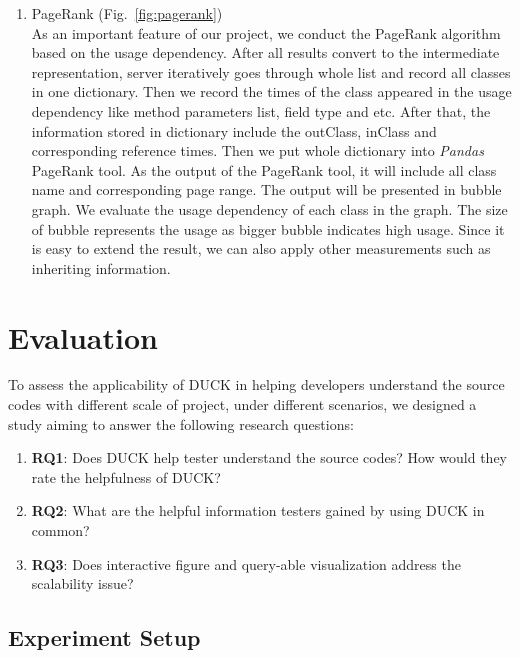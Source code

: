 \documentclass{sig-alternate}
\begin{document}
\begin{enumerate}
\vspace{-6pt}
\item PageRank (Fig.~\ref{fig:pagerank}) \\ 
As an important feature of our project, we conduct the PageRank algorithm based on the usage dependency. After all results convert to the intermediate representation, server iteratively goes through whole list and record all classes in one dictionary. Then we record the times of the class appeared in the usage dependency like method parameters list, field type and etc. After that, the information stored in dictionary include the outClass, inClass and corresponding reference times. Then we put whole dictionary into \emph{Pandas} PageRank tool. As the output of the PageRank tool, it will include all class name and corresponding page range. The output will be presented in bubble graph. We evaluate the usage dependency of each class in the graph. The size of bubble represents the usage as bigger bubble indicates high usage. Since it is easy to extend the result, we can also apply other measurements such as inheriting information.

\end{enumerate}


\section{Evaluation}

To assess the applicability of DUCK in helping developers understand the source codes with different scale of project, under different scenarios, we designed a study aiming to answer the following research questions:
\begin{enumerate}
\item \textbf{RQ1}: Does DUCK help tester understand the source codes? How would they rate the helpfulness of DUCK?
\vspace{-6pt}
\item \textbf{RQ2}: What are the helpful information testers gained by using DUCK in common?
\vspace{-6pt}
\item \textbf{RQ3}: Does interactive figure and query-able visualization address the scalability issue?
\end{enumerate}

\subsection{Experiment Setup}
\end{document}
